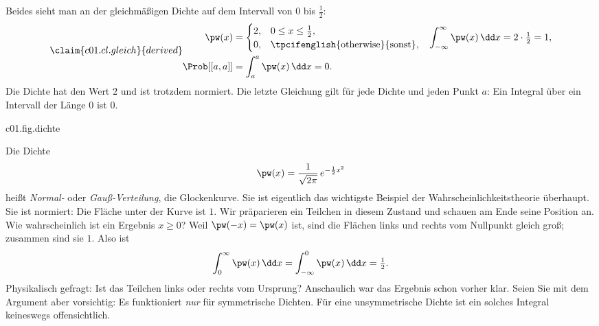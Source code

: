 Beides sieht man an der gleichmäßigen Dichte auf dem Intervall von $0$ bis $\tfrac12$:
\begin{equation}\label{c01.eq.gleich}\claim{c01.cl.gleich}{derived}
  \begin{aligned}
    \pw(x) &=
    \begin{cases}
      2, & 0 \leq x \leq \tfrac12, \\
      0, & \text{\tpcifenglish{otherwise}{sonst}},
    \end{cases}
    &\int_{-\infty}^{\infty} \pw(x)\,\dd x &= 2\cdot\tfrac12 = 1, \\
    \Prob[[a,a]] &= \int_a^a \pw(x)\,\dd x = 0 .
  \end{aligned}
\end{equation}
Die Dichte hat den Wert $2$ und ist trotzdem normiert. Die letzte Gleichung gilt für jede
Dichte und jeden Punkt $a$: Ein Integral über ein Intervall der Länge $0$ ist $0$.

\begin{tpcfigure}{c01.fig.dichte}

  \caption{(a) Die Dichte der Gauß-Verteilung aus Beispiel~\ref{c01.ex.gauss}. Die
    Wahrscheinlichkeit, dass das Ergebnis zwischen reellen Endpunkten $a \leq b$ liegt, ist die schraffierte
    Fläche und nicht die Höhe der Kurve. (b) Die gleichmäßige Dichte aus
    Gleichung~\eqref{c01.eq.gleich}: Sie hat die Höhe $2$, die Fläche darunter ist $1$.}
\end{tpcfigure}

\begin{example}\label{c01.ex.gauss}
  Die Dichte
  \begin{equation}\label{c01.eq.gauss}
    \pw(x) = \frac{1}{\sqrt{2\pi}}\, e^{-\frac12 x^2}
  \end{equation}
  heißt \emph{Normal-} oder \emph{Gauß-Verteilung}, die Glockenkurve. Sie ist eigentlich das
  wichtigste Beispiel der Wahrscheinlichkeitstheorie überhaupt. Sie ist normiert: Die Fläche
  unter der Kurve ist $1$. Wir präparieren ein Teilchen in diesem Zustand
  und schauen am Ende seine Position an. Wie wahrscheinlich ist ein Ergebnis $x \geq 0$?
  Weil $\pw(-x) = \pw(x)$ ist, sind die Flächen links und rechts vom Nullpunkt gleich groß;
  zusammen sind sie $1$. Also ist
  \begin{equation}\label{c01.eq.gauss-halb}
    \int_0^\infty \pw(x)\,\dd x = \int_{-\infty}^0 \pw(x)\,\dd x = \tfrac12 .
  \end{equation}
  Physikalisch gefragt: Ist das Teilchen links oder rechts vom Ursprung? Anschaulich war das
  Ergebnis schon vorher klar. Seien Sie mit dem Argument aber vorsichtig: Es funktioniert
  \emph{nur} für symmetrische Dichten. Für eine unsymmetrische Dichte ist ein solches
  Integral keineswegs offensichtlich.
\end{example}

